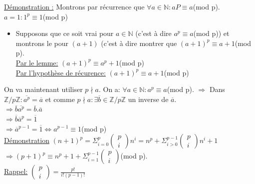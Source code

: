 \documentclass[11pt]{article}
\begin{document}
				\underline{Démonstration :}
				Montrons par récurrence que $\forall a \in \mathbb{N}: aP \equiv a$(mod p).\\
				$a = 1: 1^p \equiv 1$(mod p)\\
				\begin{itemize}
				 	\item Supposons que ce soit vrai pour $a \in \mathbb{N}$ (c'est à dire  $a^p \equiv a$(mod p)) et montrons le pour $(a+1)$ (c'est à 	      dire montrer que $(a+1)^p \equiv a+1$(mod p).\\
					 \underline{Par le lemme:} $(a+1)^p \equiv a^p + 1$(mod p)\\
				 	\underline{Par l'hypothèse de récurence:} $(a+1)^p \equiv a + 1$(mod p)
				\end{itemize}
		
				On va maintenant utiliser $p \nmid a$.  On a: $\forall a \in \mathbb{N}: a^p \equiv a$(mod p).
				$\Rightarrow$ Dans $\mathbb{Z}/p\mathbb{Z}: \overline{a^p} = \overline{a}$ et comme $p \nmid a: \exists \overline{b} \in \mathbb{Z}/p\mathbb{Z}$ un inverse de $\overline{a}$.\\
				$\Rightarrow \overline{b} \overline{a^p} = \overline{b}.\overline{a}$\\ 
				$\Rightarrow \overline{b} \overline{a}^p = \overline{1}$\\
				$\Rightarrow \overline{a}^{p-1} = \overline{1} \Leftrightarrow a^{p-1} \equiv 1$(mod p)\\
				
				\underline{Démonstration}
					$(n+1)^p = \Sigma_{i=0}^p \begin{pmatrix}p\\i\end{pmatrix} n^i = n^p + \Sigma_{i>0}^{p-1} \begin{pmatrix}p\\i\end{pmatrix} n^i + 1$ \\
					$\Rightarrow (p+1)^p \equiv n^p + 1 + \Sigma_{i=1}^{p-1} \begin{pmatrix}p\\i\end{pmatrix}$(mod p).\\
					\underline{Rappel:} $\begin{pmatrix}p\\i\end{pmatrix} = \frac{p!}{i! (p-1)!}$\\
			
\end{document}
